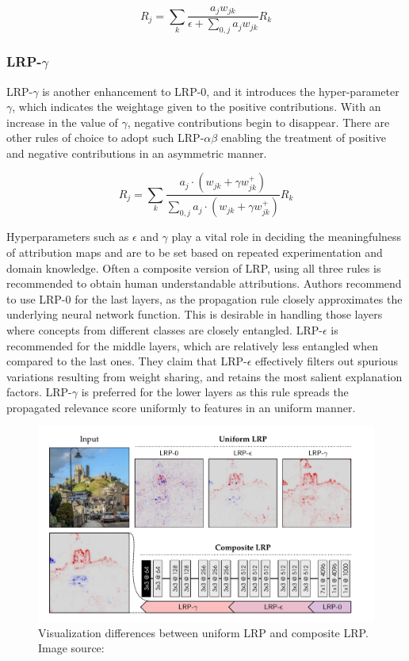 \documentclass[../report.tex]{subfiles}
\begin{document}
\begin{equation}
	R_j=\sum_k \frac{a_j w_{j k}}{\epsilon+\sum_{0, j} a_j w_{j k}} R_k
\end{equation}

\subsubsection{LRP-$\gamma$}
LRP-$\gamma$ is another enhancement to LRP-0, and it introduces the hyper-parameter $\gamma$, which indicates the weightage given to the positive contributions. With an increase in the value of $\gamma$, negative contributions begin to disappear. There are other rules of choice to adopt such LRP-$\alpha\beta$ enabling the treatment of positive and negative contributions in an asymmetric manner.

\begin{equation}
	R_j=\sum_k \frac{a_j \cdot\left(w_{j k}+\gamma w_{j k}^{+}\right)}{\sum_{0, j} a_j \cdot\left(w_{j k}+\gamma w_{j k}^{+}\right)} R_k
\end{equation}


Hyperparameters such as $\epsilon$ and $\gamma$ play a vital role in deciding the meaningfulness of attribution maps and are to be set based on repeated experimentation and domain knowledge. Often a composite version of LRP, using all three rules is recommended to obtain human understandable attributions.
Authors recommend to  use LRP-0 for the last layers, as the propagation rule closely approximates the underlying  neural network function. This is desirable in handling those layers where concepts from different classes are closely entangled. LRP-$\epsilon$ is recommended for the middle layers, which are relatively less entangled when compared to the last ones. They claim that LRP-$\epsilon$ effectively filters out spurious variations resulting from weight sharing, and retains the most salient explanation factors. LRP-$\gamma$ is preferred for the lower layers as this rule spreads the propagated relevance score uniformly to features in an uniform manner.

 \begin{figure}[H]
	\centering
	\includegraphics[scale=0.3]{images/chapter3/lrp.png}
	\caption{Visualization differences between uniform LRP and composite LRP. Image source: \cite{lrp}}
	\label{fig_lrp}
\end{figure}
\end{document}
